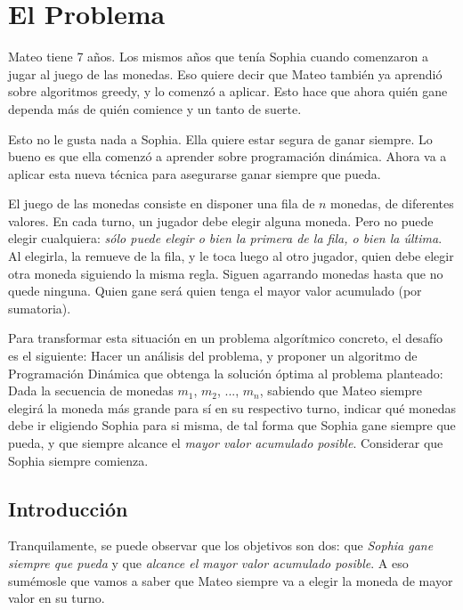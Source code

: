 \section{El Problema}

Mateo tiene 7 años. Los mismos años que tenía Sophia cuando comenzaron a jugar al juego de las monedas. Eso quiere decir que Mateo también ya aprendió sobre algoritmos greedy, y lo comenzó a aplicar. Esto hace que ahora quién gane dependa más de quién comience y un tanto de suerte.

Esto no le gusta nada a Sophia. Ella quiere estar segura de ganar siempre. Lo bueno es que ella comenzó a aprender sobre programación dinámica. Ahora va a aplicar esta nueva técnica para asegurarse ganar siempre que pueda.

El juego de las monedas consiste en disponer una fila de $n$ monedas, de diferentes valores. En cada turno, un jugador debe elegir alguna moneda. Pero no puede elegir cualquiera: \textit{sólo puede elegir o bien la primera de la fila, o bien la última}. Al elegirla, la remueve de la fila, y le toca luego al otro jugador, quien debe elegir otra moneda siguiendo la misma regla. Siguen agarrando monedas hasta que no quede ninguna. Quien gane será quien tenga el mayor valor acumulado (por sumatoria).

Para transformar esta situación en un problema algorítmico concreto, el desafío es el siguiente:
Hacer un análisis del problema, y proponer un algoritmo de Programación Dinámica que obtenga la solución óptima al problema planteado:
Dada la secuencia de monedas $m_1$, $m_2$, ..., $m_{n}$, sabiendo que Mateo siempre elegirá la moneda más grande para sí en su respectivo turno, indicar qué monedas debe ir eligiendo Sophia para si misma, de tal forma que Sophia gane siempre que pueda, y que siempre alcance el \textit{mayor valor acumulado posible}. Considerar que Sophia siempre comienza.

\subsection{Introducción}

Tranquilamente, se puede observar que los objetivos son dos: que \textit{Sophia gane siempre que pueda} y que \textit{alcance el mayor valor acumulado posible}. A eso sumémosle que vamos a saber que Mateo siempre va a elegir la moneda de mayor valor en su turno.

